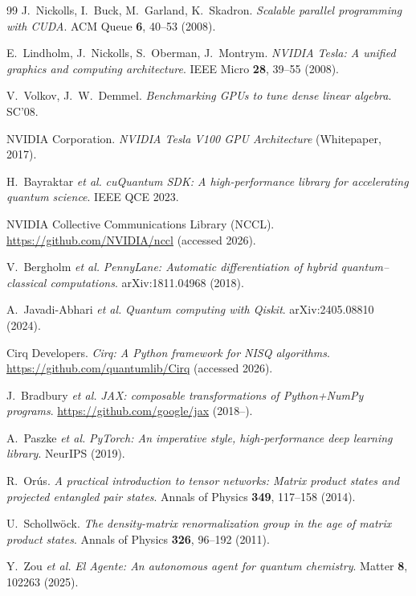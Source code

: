 \documentclass[11pt,a4paper]{article}
\begin{document}
\begin{thebibliography}{99}
  J.~Nickolls, I.~Buck, M.~Garland, K.~Skadron.
  \textit{Scalable parallel programming with CUDA}. ACM Queue \textbf{6}, 40--53 (2008).

  E.~Lindholm, J.~Nickolls, S.~Oberman, J.~Montrym.
  \textit{NVIDIA Tesla: A unified graphics and computing architecture}.
  IEEE Micro \textbf{28}, 39--55 (2008).

  V.~Volkov, J.~W.~Demmel.
  \textit{Benchmarking GPUs to tune dense linear algebra}. SC'08.

  NVIDIA Corporation.
  \textit{NVIDIA Tesla V100 GPU Architecture} (Whitepaper, 2017).

  H.~Bayraktar \textit{et al.}
  \textit{cuQuantum SDK: A high-performance library for accelerating quantum
  science}. IEEE QCE 2023.

  NVIDIA Collective Communications Library (NCCL).
  \url{https://github.com/NVIDIA/nccl} (accessed 2026).

  V.~Bergholm \textit{et al.}
  \textit{PennyLane: Automatic differentiation of hybrid quantum--classical
  computations}. arXiv:1811.04968 (2018).

  A.~Javadi-Abhari \textit{et al.}
  \textit{Quantum computing with Qiskit}. arXiv:2405.08810 (2024).

  Cirq Developers.
  \textit{Cirq: A Python framework for NISQ algorithms}.
  \url{https://github.com/quantumlib/Cirq} (accessed 2026).

  J.~Bradbury \textit{et al.}
  \textit{JAX: composable transformations of Python+NumPy programs}.
  \url{https://github.com/google/jax} (2018--).

  A.~Paszke \textit{et al.}
  \textit{PyTorch: An imperative style, high-performance deep learning library}.
  NeurIPS (2019).

  R.~Or\'us.
  \textit{A practical introduction to tensor networks: Matrix product states and
  projected entangled pair states}.
  Annals of Physics \textbf{349}, 117--158 (2014).

  U.~Schollw\"ock.
  \textit{The density-matrix renormalization group in the age of matrix product
  states}.
  Annals of Physics \textbf{326}, 96--192 (2011).

  Y.~Zou \textit{et al.}
  \textit{El Agente: An autonomous agent for quantum chemistry}.
  Matter \textbf{8}, 102263 (2025).


\end{thebibliography}
\end{document}
